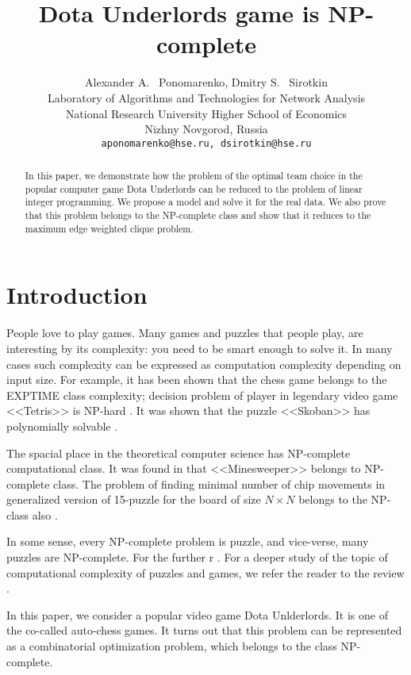 \documentclass{article}
\title{Dota Underlords game is NP-complete}
\author{
  Alexander A. ~Ponomarenko, Dmitry S. ~Sirotkin \\
  Laboratory of Algorithms and Technologies for Network Analysis\\
  National Research University Higher School of Economics \\
  Nizhny Novgorod, Russia\\
  \texttt{aponomarenko@hse.ru, dsirotkin@hse.ru} \\
}
\begin{document}
\maketitle

\begin{abstract}
In this paper, we demonstrate how the problem of the optimal team choice in the popular computer game Dota Underlords can be reduced to the problem of linear integer  programming. We propose a model and solve it for the real data. We also prove that this problem belongs to the NP-complete class and show that it reduces to the maximum edge weighted clique problem.

\end{abstract}




\section{Introduction}
People love to play games. Many games and puzzles that people play, are interesting by its complexity: you need to be smart  enough to solve it. In many cases such complexity can be expressed as computation complexity depending on input size. For example, it has been shown \cite{fraenkel1981computing} that the chess game belongs to the EXPTIME class complexity; 
decision problem of player in legendary video game <<Tetris>> is NP-hard \cite{breukelaar2004tetris}. It was shown that the puzzle  <<Skoban>>  has polynomially solvable \cite{hearn2005pspace}.

The spacial place in the theoretical computer science has NP-complete computational class.
It was found in \cite{kaye2000minesweeper} that <<Minesweeper>> belongs to NP-complete class. The problem of finding minimal number of chip movements in generalized version of 15-puzzle for the board of size $N \times N$ belongs to the NP-class also  \cite{ratner1986finding}.

In some sense, every NP-complete problem is puzzle, and vice-verse, many puzzles are NP-complete. For the further r . For a deeper study of the topic of computational complexity of puzzles and games, we refer the reader to the review \cite{costa2018computational}.

In this paper, we consider a popular video game Dota Unlderlords. It is one of the co-called  auto-chess games. It turns out that this problem can be represented as a combinatorial optimization problem, which belongs to the class NP-complete.
\end{document}
